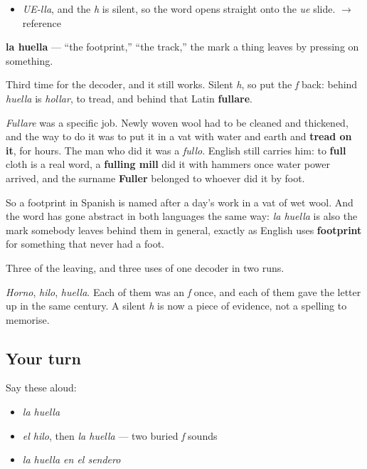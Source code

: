 \begin{sounds}
\begin{itemize}
\raggedright
  \item \emph{UE-lla}, and the \emph{h} is silent, so the word opens straight onto the \emph{ue} slide. $\to$ reference
\end{itemize}
\end{sounds}

\begin{cousinweb}
\textbf{la huella} — \textquotedblleft{}the footprint,\textquotedblright{} \textquotedblleft{}the track,\textquotedblright{} the mark a thing leaves by pressing on something.

Third time for the decoder, and it still works. Silent \emph{h}, so put the \emph{f} back: behind \emph{huella} is \emph{hollar}, to tread, and behind that Latin \textbf{fullare}.

\emph{Fullare} was a specific job. Newly woven wool had to be cleaned and thickened, and the way to do it was to put it in a vat with water and earth and \textbf{tread on it}, for hours. The man who did it was a \emph{fullo}. English still carries him: to \textbf{full} cloth is a real word, a \textbf{fulling mill} did it with hammers once water power arrived, and the surname \textbf{Fuller} belonged to whoever did it by foot.

So a footprint in Spanish is named after a day's work in a vat of wet wool. And the word has gone abstract in both languages the same way: \emph{la huella} is also the mark somebody leaves behind them in general, exactly as English uses \textbf{footprint} for something that never had a foot.
\end{cousinweb}

\begin{grammarlens}[title={What you've built}]
Three of the leaving, and three uses of one decoder in two runs.

\emph{Horno}, \emph{hilo}, \emph{huella}. Each of them was an \emph{f} once, and each of them gave the letter up in the same century. A silent \emph{h} is now a piece of evidence, not a spelling to memorise.
\end{grammarlens}

\subsection*{Your turn}
Say these aloud:

\begin{itemize}
\raggedright
  \item \emph{la huella}
  \item \emph{el hilo}, then \emph{la huella} — two buried \emph{f} sounds
  \item \emph{la huella en el sendero}
\end{itemize}

